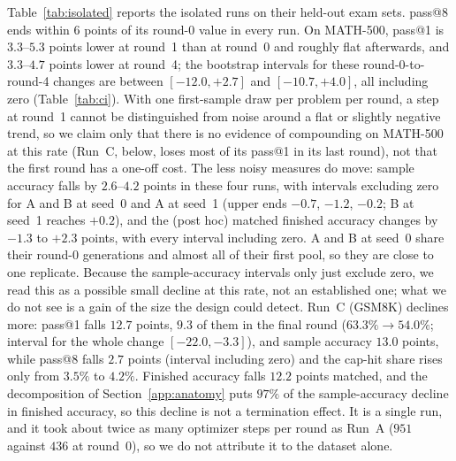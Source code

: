 \documentclass[runningheads]{llncs}
\begin{document}
Table~\ref{tab:isolated} reports the isolated runs on their held-out exam sets.
pass@8 ends within $6$ points of its round-0 value in every run. On MATH-500,
pass@1 is $3.3$--$5.3$ points lower at round~1 than at round~0 and roughly flat
afterwards, and $3.3$--$4.7$ points lower at round~4; the bootstrap intervals for
these round-0-to-round-4 changes are between $[-12.0,+2.7]$ and $[-10.7,+4.0]$,
all including zero (Table~\ref{tab:ci}). With one first-sample draw per problem
per round, a step at round~1 cannot be distinguished from noise around a flat or
slightly negative trend, so we claim only that there is no evidence of
compounding on MATH-500 at this rate (Run~C, below, loses most of its pass@1 in
its last round), not that the first round has a one-off cost. The less
noisy measures do move: sample accuracy falls by $2.6$--$4.2$ points in these
four runs, with intervals excluding zero for A and B at seed~0 and A at seed~1 (upper ends $-0.7$, $-1.2$, $-0.2$; B at seed~1 reaches $+0.2$), and the (post hoc)
matched finished accuracy changes by $-1.3$ to $+2.3$ points, with every interval including zero. A
and B at seed~0 share their round-0 generations and almost all of their first
pool, so they are close to one replicate. Because the sample-accuracy intervals only just exclude zero, we
read this as a possible small decline at this rate, not an established one;
what we do not see is a gain of the size the design could detect. Run~C (GSM8K)
declines more: pass@1 falls $12.7$ points, $9.3$ of them in the final round
($63.3\%\to54.0\%$; interval for the whole change $[-22.0,-3.3]$), and sample
accuracy $13.0$ points, while pass@8 falls $2.7$ points (interval including
zero) and the cap-hit share rises only from $3.5\%$ to $4.2\%$. Finished
accuracy falls $12.2$ points matched, and the decomposition of
Section~\ref{app:anatomy} puts $97\%$ of the sample-accuracy decline in finished
accuracy, so this decline is not a termination effect. It is a single run, and
it took about twice as many optimizer steps per round as Run~A ($951$ against
$436$ at round~0), so we do not attribute it to the dataset alone.
\end{document}

